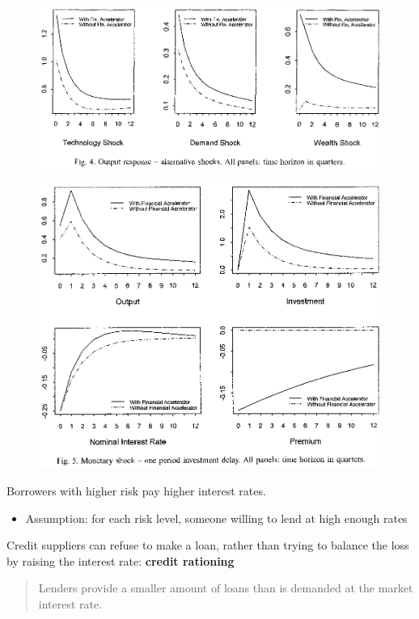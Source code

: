 \documentclass{beamer}
\begin{document}
\begin{frame}
 \begin{figure}
   \includegraphics[scale=.8]{bernanke2.eps}
 \end{figure}  
\end{frame}

\begin{frame}
 \begin{figure}
   \includegraphics[scale=.8]{bernanke3.eps}
 \end{figure}  
\end{frame}

\begin{frame}
Borrowers with higher risk pay higher interest rates.
\begin{itemize}
  \item Assumption: for each risk level, someone willing to lend at high enough rates  
\end{itemize}
\medskip
 Credit suppliers can refuse to make a loan, rather than trying to balance the loss by raising the interest rate: \textbf{credit rationing}
\begin{quote}
  Lenders provide a smaller amount of loans than is demanded at the market interest rate.
\end{quote}
\end{frame}
\end{document}
